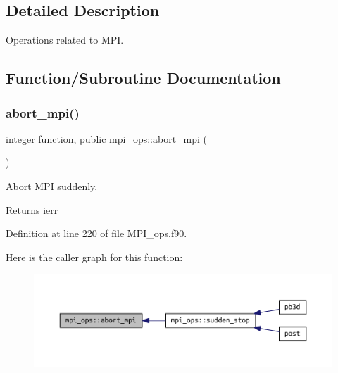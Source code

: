 \subsection{Detailed Description}
Operations related to M\+PI. 

\subsection{Function/\+Subroutine Documentation}
\mbox{\label{namespacempi__ops_a54d9258ef985728345579e8e57dc8dfe}} 
\subsubsection{\texorpdfstring{abort\+\_\+mpi()}{abort\_mpi()}}
{\footnotesize\ttfamily integer function, public mpi\+\_\+ops\+::abort\+\_\+mpi (\begin{DoxyParamCaption}{ }\end{DoxyParamCaption})}



Abort M\+PI suddenly. 

\begin{DoxyReturn}{Returns}
ierr 
\end{DoxyReturn}


Definition at line 220 of file M\+P\+I\+\_\+ops.\+f90.

Here is the caller graph for this function\+:\nopagebreak
\begin{figure}[H]
\begin{center}
\leavevmode
\includegraphics[width=350pt]{namespacempi__ops_a54d9258ef985728345579e8e57dc8dfe_icgraph}
\end{center}
\end{figure}
\mbox{\label{namespacempi__ops_a932eba1c998dd7a0f1191b55cd754be3}} 
